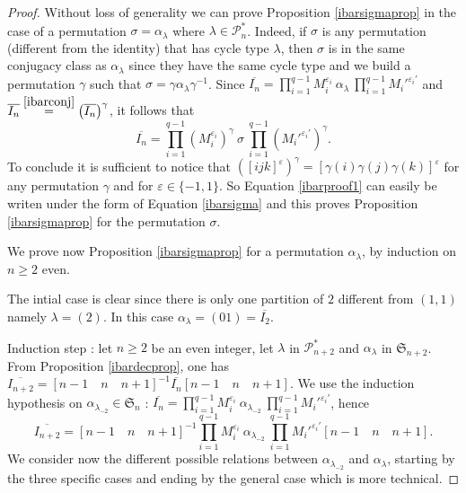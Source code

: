 \documentclass[a4paper,12pt,fleqn]{article}
\newcommand\SYM[1][n]{\mathfrak{S}_{#1}}
\renewcommand\epsilon{\varepsilon}
\renewcommand\geq{\geqslant}
\begin{document}
\begin{proof}
     Without loss of generality we can prove Proposition \ref{ibarsigmaprop} in the case of a permutation $\sigma=\alpha_{\lambda}$
    where $\lambda\in\mathcal{P}_n^{*}$. Indeed, if $\sigma$ is any permutation (different from the identity) that has cycle type $\lambda$, then $\sigma$ is in the same conjugacy
    class as $\alpha_{\lambda}$ since they have the same cycle type and we build a permutation $\gamma$ such that $\sigma=\gamma\alpha_{\lambda}\gamma^{-1}$. Since 
$\overline{ I_n}=\prod\limits_{i=1}^{q-1}M_i^{\varepsilon_i}\ \alpha_{\lambda}\ \prod\limits_{i=1}^{q-1}M_i'^{\varepsilon_i'}$ and
$\overline{ I_n}\stackrel{\ref{ibarconj}}{=}\left(\overline{ I_n}\right)^{\gamma}$, it follows that
\begin{equation}\label{ibarproof1}
\overline{ I_n}=\prod\limits_{i=1}^{q-1}\left(M_i^{\varepsilon_i}\right)^{\gamma}\ \sigma\
\prod\limits_{i=1}^{q-1}\left(M_i'^{\varepsilon_i'}\right)^{\gamma}.
\end{equation}
To conclude it is sufficient to notice that $\left([ijk]^{\epsilon}\right)^{\gamma}=[\gamma(i) \gamma(j) \gamma(k)]^{\epsilon}$ for any permutation $\gamma$ and for $\epsilon\in\{-1,1\}$.
So Equation \eqref{ibarproof1} can easily be
writen under the form of Equation \eqref{ibarsigma} and this proves Proposition \ref{ibarsigmaprop} for the permutation $\sigma$. 


We prove now  Proposition \ref{ibarsigmaprop} for a permutation $\alpha_{\lambda}$, by induction on $n\geq 2$ even.

The intial case is clear since there is only
one partition of $2$ different from $(1,1)$ namely $\lambda=(2)$. In this case $\alpha_{\lambda}=(01)=\overline{I_2}$.

      Induction step : let $n\geq  2$ be an even integer,  let $\lambda$ in $\mathcal{P}_{n+2}^{*}$ and $\alpha_{\lambda}$ in $\SYM[n+2]$.
      From Proposition \ref{ibardecprop}, one has $\overline{I_{n+2}}=[n-1\quad n\quad n+1]^{-1}\overline{I_n}[n-1\quad n\quad n+1]$.
      We use the induction hypothesis on $\alpha_{\lambda_{-2}}\in\SYM$ :
      $\overline{I_n}=\prod\limits_{i=1}^{q-1}M_i^{\varepsilon_i}\ \alpha_{\lambda_{-2}}\ \prod\limits_{i=1}^{q-1}M_i'^{\varepsilon_i'}$, hence
      \begin{equation}\label{ibarproof2}
        \overline{I_{n+2}}=[n-1\quad n\quad n+1]^{-1}\prod\limits_{i=1}^{q-1}M_i^{\varepsilon_i}\ \alpha_{\lambda_{-2}}\ \prod\limits_{i=1}^{q-1}M_i'^{\varepsilon_i'}[n-1\quad n\quad n+1].
      \end{equation}
      We consider now the different possible relations between $\alpha_{\lambda_{-2}}$ and $\alpha_{\lambda}$, starting by the three specific cases
      and ending by the general case which is more technical.
      

\end{proof}
\end{document}
